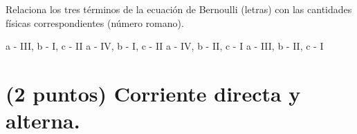 \documentclass[12pt]{exam}
\begin{document}
\begin{questions}
    Relaciona los tres términos de la ecuación de Bernoulli (letras) con las cantidades físicas correspondientes (número romano).
    \begin{tasks}
        \task a - III, b - I, c - II
        \task a - IV, b - I, c - II
        \task a - IV, b - II, c - I
        \task a - III, b - II, c - I
    \end{tasks}
    
    \section{(2 puntos) Corriente directa y alterna.}

    

\end{questions}
\end{document}

